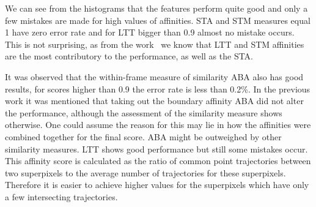 We can see from the histograms that the features perform quite good and only a few mistakes are made for high values of affinities. STA and STM measures equal 1 have zero error rate and for LTT bigger than 0.9 
almost no mistake occurs. This is not surprising, as from the work~\cite{GalassoCS12} we know that LTT and STM affinities are the most contributory to the performance, as well as the STA.

It was observed that the within-frame measure of similarity ABA also has good results, for scores higher than 0.9 the error rate is less than 0.2\%. In the previous work it was mentioned that taking out the boundary
affinity ABA did not alter the performance, although the assessment of the similarity measure shows otherwise. One could assume the reason for this may lie in how the affinities were combined together for the final score.
ABA might be outweighed by other similarity measures. 
LTT shows good performance but still some mistakes occur.
This affinity score is calculated as the ratio of common point trajectories between two superpixels to the average number of trajectories for these superpixels. Therefore it is easier to achieve
higher values for the superpixels which have only a few intersecting trajectories. 

